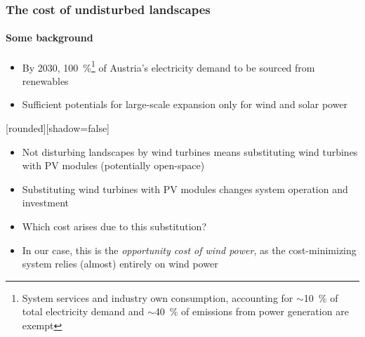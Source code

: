 \documentclass[aspectratio=1610, xcolor=dvipsnames]{beamer}
\begin{document}
    \begin{frame}
        \frametitle{The cost of undisturbed landscapes}
        \framesubtitle{Some background}
        \begin{itemize}
            \item By 2030, \SI{100}{\percent}\footnote[frame]{System services and industry own consumption,
            accounting for $\sim$\SI{10}{\percent} of total electricity demand and $\sim$\SI{40}{\percent} of  emissions from power
            generation are exempt} of Austria's electricity demand to be sourced from renewables
            \item Sufficient potentials for large-scale expansion only for wind and solar power
        \end{itemize}
        \medskip
        {%
            [rounded][shadow=false]
            \begin{block}{}
                \begin{itemize}
                    \item Not disturbing landscapes by wind turbines means substituting wind turbines with PV modules (potentially open-space)
                \end{itemize}
            \end{block}
        }%
        \medskip
        \begin{itemize}
            \item Substituting wind turbines with PV modules changes system operation and investment
            \item Which cost arises due to this substitution?
            \item In our case, this is the \emph{opportunity cost of wind power}, as the cost-minimizing system relies
            (almost) entirely on wind power
        \end{itemize}
    \end{frame}
\end{document}
